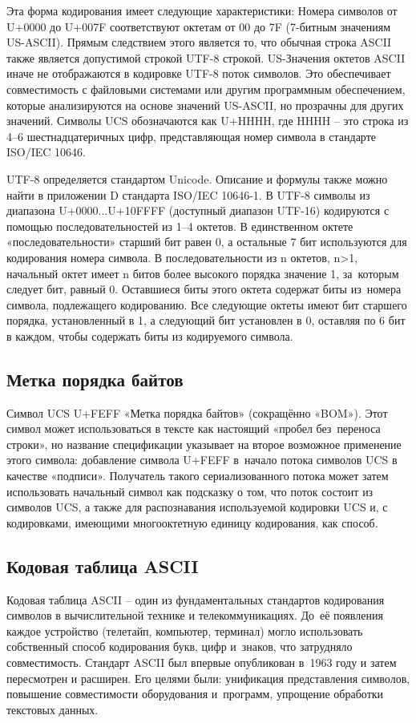 \documentclass{ou}
\begin{document}
Эта форма кодирования имеет следующие характеристики: Номера символов от U+0000 до U+007F  соответствуют октетам от 00 до 7F (7-битным значениям US-ASCII). Прямым следствием этого является то, что обычная строка ASCII также является допустимой строкой UTF-8 строкой. US-Значения октетов ASCII иначе не отображаются в кодировке UTF-8 поток символов. Это обеспечивает совместимость с файловыми системами или другим программным обеспечением, которые анализируются на основе значений US-ASCII, но прозрачны для других значений.  Символы UCS обозначаются как U+HHHH, где HHHH -- это строка из 4--6 шестнадцатеричных цифр, представляющая номер символа в стандарте ISO/IEC 10646.

UTF-8 определяется стандартом Unicode. Описание и формулы также можно найти в приложении D стандарта ISO/IEC 10646-1. В UTF-8 символы из диапазона U+0000...U+10FFFF (доступный диапазон UTF-16) кодируются с помощью последовательностей из 1--4 октетов. В единственном октете «последовательности» старший бит равен 0, а остальные 7 бит используются для кодирования номера символа. В последовательности из n октетов, n>1, начальный октет имеет n битов более высокого порядка значение 1, за~которым следует бит, равный 0. Оставшиеся биты этого октета содержат биты из~номера символа, подлежащего кодированию. Все следующие октеты имеют бит старшего порядка, установленный в 1, а следующий бит установлен в 0, оставляя по 6 бит в каждом, чтобы содержать биты из кодируемого символа.
\subsection{Метка порядка байтов}
Символ UCS U+FEFF «Метка порядка байтов» (сокращённо «BOM»). Этот символ может использоваться в тексте как настоящий «пробел без~переноса строки», но название спецификации указывает на второе возможное применение этого символа: добавление символа U+FEFF в~начало потока символов UCS в качестве «подписи». Получатель такого сериализованного потока может затем использовать начальный символ как подсказку о том, что поток состоит из символов UCS, а также для распознавания используемой кодировки UCS и, с кодировками, имеющими многооктетную единицу кодирования, как способ.
\subsection{Кодовая таблица ASCII}
Кодовая таблица ASCII -- один из фундаментальных стандартов кодирования символов в вычислительной технике и телекоммуникациях. До~её появления каждое устройство (телетайп, компьютер, терминал) могло использовать собственный способ кодирования букв, цифр и~знаков, что затрудняло совместимость. Стандарт ASCII был впервые опубликован в~1963 году и затем пересмотрен и расширен. Его целями были: унификация представления символов, повышение совместимости оборудования и~программ, упрощение обработки текстовых данных. 
\end{document}
